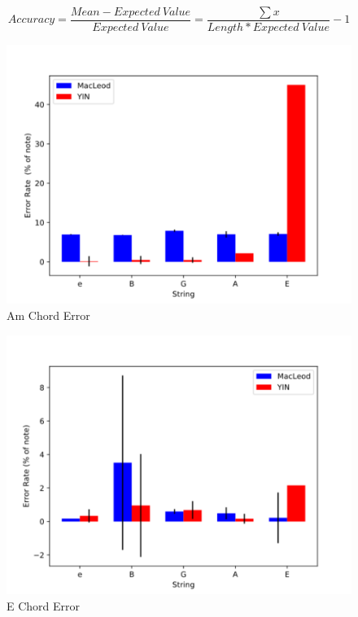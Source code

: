 \begin{equation}
  \label{chord-accuracy-equation}
  Accuracy = \frac{Mean - Expected\ Value}{Expected\ Value} = \frac{\sum x}{Length * Expected\ Value} -1
\end{equation}

\begin{figure}[!htpb]
  \centering
  \caption{Am Chord Error}
  \label{am-chord-error}
  \includegraphics[scale=0.85]{images/measurements/am-chord-error}
\end{figure}

\begin{figure}[!htpb]
  \centering
  \caption{E Chord Error}
  \label{e-chord-error}
  \includegraphics[scale=0.85]{images/measurements/e-chord-error}
\end{figure}

